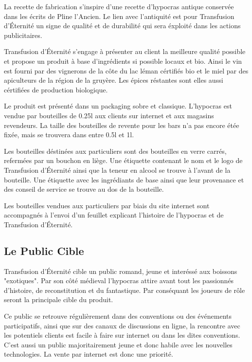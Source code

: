 \documentclass[10pt,a4paper]{article}
\newcommand{\tde}{Transfusion d'Éternité}
\begin{document}
La recette de fabrication s'inspire d'une recette d'hypocras antique conservée dans les écrits de Pline l'Ancien.
Le lien avec l'antiquité est pour \tde{} un signe de qualité et de durabilité qui sera éxploité dans les actions publicitaires.

\tde{} s'engage à présenter au client la meilleure qualité possible et propose un produit à base d'ingrédients si possible locaux et bio.
Ainsi le vin est fourni par des vignerons de la côte du lac léman cértifiés bio et le miel par des apiculteurs de la région de la gruyère.
Les épices réstantes sont elles aussi cértifiées de production biologique.

Le produit est présenté dans un packaging sobre et classique.
L'hypocras est vendue par bouteilles de 0.25l aux clients sur internet et aux magasins revendeurs.
La taille des bouteilles de revente pour les bars n'a pas encore étée fixée, mais se trouvera dans entre 0.5l et 1l.

Les bouteilles déstinées aux particuliers sont des bouteilles en verre carrés, refermées par un bouchon en liège.
Une étiquette contenant le nom et le logo de \tde{} ainsi que la teneur en alcool se trouve à l'avant de la bouteille.
Une étiquette avec les ingrédiants de base ainsi que leur provenance et des conseil de service se trouve au dos de la bouteille.

Les bouteilles vendues aux particuliers par biais du site internet sont accompagnés à l'envoi d'un feuillet explicant l'histoire de l'hypocras et de \tde{}.

\subsection{Le Public Cible}
\tde{} cible un public romand, jeune et interéssé aux boissons "exotiques".
Par son côté médieval l'hypocras attire avant tout les passionnés d'histoire, de reconstitution et du fantastique.
Par conséquant les joueurs de rôle seront la principale cible du produit.

Ce public se retrouve régulièrement dans des conventions ou des événements participatifs, ainsi que sur des canaux de discussions en ligne, la rencontre avec les potentiels clients est facile à faire sur internet ou dans les dites conventions.
C'est aussi un public majoritairement jeune et donc habile avec les nouvelles technologies.
La vente par internet est donc une priorité.
\end{document}
